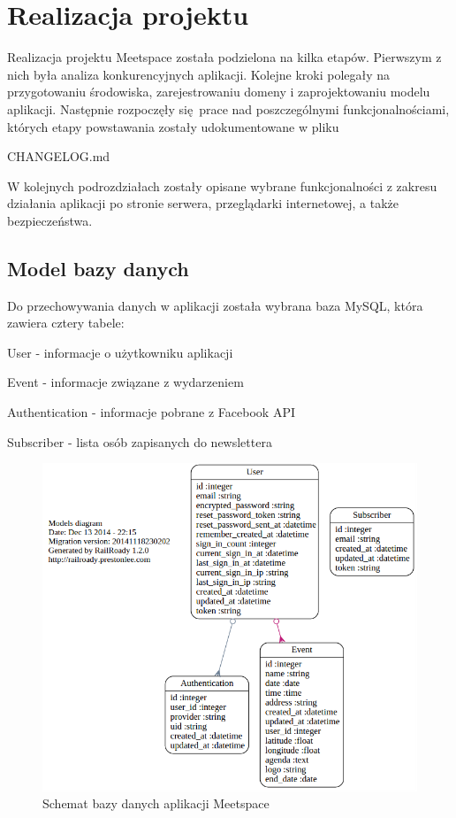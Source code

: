 \section{Realizacja projektu}
Realizacja projektu Meetspace została podzielona na kilka etapów. Pierwszym z nich była analiza konkurencyjnych aplikacji. Kolejne kroki polegały na przygotowaniu środowiska, zarejestrowaniu domeny i zaprojektowaniu modelu aplikacji. Następnie rozpoczęły się prace nad poszczególnymi funkcjonalnościami, których etapy powstawania zostały udokumentowane w pliku \begin{tt}CHANGELOG.md\end{tt}

W kolejnych podrozdziałach zostały opisane wybrane funkcjonalności z zakresu działania aplikacji po stronie serwera, przeglądarki internetowej, a także bezpieczeństwa.
  \clearpage
  \subsection{Model bazy danych}
    Do przechowywania danych w aplikacji została wybrana baza MySQL, która zawiera cztery tabele:
    \begin{itemizeReduced}
      \item User - informacje o użytkowniku aplikacji
      \item Event - informacje związane z wydarzeniem
      \item Authentication - informacje pobrane z Facebook API
      \item Subscriber - lista osób zapisanych do newslettera
    \end{itemizeReduced}

    \begin{figure}[h]
      \centering
        \includegraphics[scale=0.55]{images/dbm.png}
      \caption{Schemat bazy danych aplikacji Meetspace}
      \label{fig:dbm}
    \end{figure}

